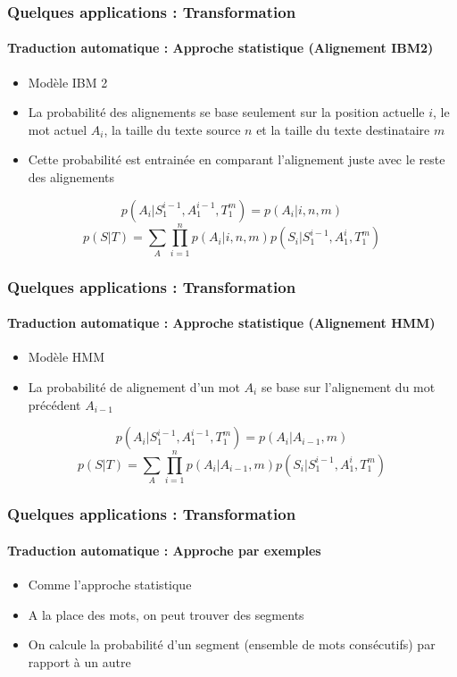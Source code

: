 \documentclass[xcolor=table]{beamer}
\begin{document}
\begin{frame}
	\frametitle{Quelques applications : Transformation}
	\framesubtitle{Traduction automatique : Approche statistique (Alignement IBM2)}
	\begin{itemize}
		\item Modèle IBM 2
		\item La probabilité des alignements se base seulement sur la position actuelle $i$, le mot actuel $A_i$, la taille du texte source $n$ et la taille du texte destinataire $m$
		\item Cette probabilité est entrainée en comparant l'alignement juste avec le reste des alignements
	\end{itemize}
	
	\[p(A_i | S_1^{i-1}, A_1^{i-1}, T_1^{m}) = p(A_i | i, n, m)\]
	\[p(S|T) = \sum_{A} \prod_{i=1}^{n} p(A_i | i, n, m) p(S_i | S_1^{i-1}, A_1^{i}, T_1^{m})\]
\end{frame}

\begin{frame}
	\frametitle{Quelques applications : Transformation}
	\framesubtitle{Traduction automatique : Approche statistique (Alignement HMM)}
	\begin{itemize}
		\item Modèle HMM
		\item La probabilité de alignement d'un mot $A_i$ se base sur l'alignement du mot précédent $A_{i-1}$
	\end{itemize}
	
	\[p(A_i | S_1^{i-1}, A_1^{i-1}, T_1^{m}) = p(A_i | A_{i-1}, m)\]
	\[p(S|T) = \sum_{A} \prod_{i=1}^{n} p(A_i | A_{i-1}, m) p(S_i | S_1^{i-1}, A_1^{i}, T_1^{m})\]
\end{frame}

\begin{frame}
	\frametitle{Quelques applications : Transformation}
	\framesubtitle{Traduction automatique : Approche par exemples}
	\begin{itemize}
		\item Comme l'approche statistique
		\item A la place des mots, on peut trouver des segments
		\item On calcule la probabilité d'un segment (ensemble de mots consécutifs) par rapport à un autre
	\end{itemize}
\end{frame}
\end{document}

